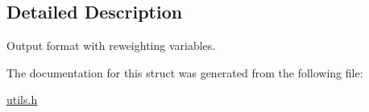 \subsection{Detailed Description}
Output format with reweighting variables. 

The documentation for this struct was generated from the following file\+:\begin{DoxyCompactItemize}
\item 
\mbox{\hyperlink{utils_8h}{utils.\+h}}\end{DoxyCompactItemize}
